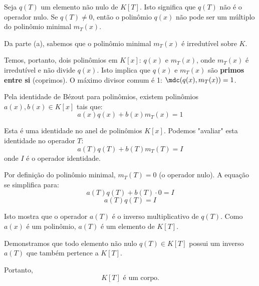 Seja $q(T)$ um elemento não nulo de $K[T]$. Isto significa que $q(T)$ não é o operador nulo. Se $q(T) \neq 0$, então o polinômio $q(x)$ não pode ser um múltiplo do polinômio minimal $m_T(x)$.

Da parte (a), sabemos que o polinômio minimal $m_T(x)$ é irredutível sobre $K$.

Temos, portanto, dois polinômios em $K[x]$: $q(x)$ e $m_T(x)$, onde $m_T(x)$ é irredutível e não divide $q(x)$. Isto implica que $q(x)$ e $m_T(x)$ são \textbf{primos entre si} (coprimos). O máximo divisor comum é 1: $\mdc(q(x), m_T(x)) = 1$.

Pela identidade de Bézout para polinômios, existem polinômios $a(x), b(x) \in K[x]$ tais que:
\[
a(x)q(x) + b(x)m_T(x) = 1
\]

Esta é uma identidade no anel de polinômios $K[x]$. Podemos "avaliar" esta identidade no operador $T$:
\[
a(T)q(T) + b(T)m_T(T) = I
\]
onde $I$ é o operador identidade.

Por definição do polinômio minimal, $m_T(T) = 0$ (o operador nulo). A equação se simplifica para:
\[
a(T)q(T) + b(T)\cdot 0 = I
\]
\[
a(T)q(T) = I
\]

Isto mostra que o operador $a(T)$ é o inverso multiplicativo de $q(T)$. Como $a(x)$ é um polinômio, $a(T)$ é um elemento de $K[T]$.

Demonstramos que todo elemento não nulo $q(T) \in K[T]$ possui um inverso $a(T)$ que também pertence a $K[T]$.

Portanto, \[
K[T] \text{ é um corpo.}
\]